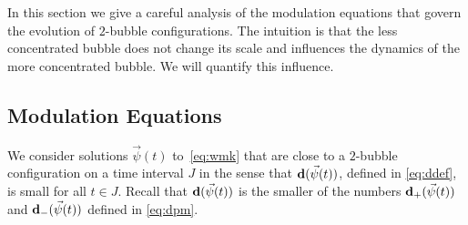 \documentclass[10pt,reqno]{amsart}
\newcommand{\red}[1]{\textcolor{red}{#1}}
\newcommand{\Red}[1]{{\color{red} #1}}
\newcommand{\HH}{\mathcal{H}}
\newcommand{\la}{\lambda}
\newcommand{\La}{\Lambda}
\newcommand{\p}{\partial}
\newcommand{\EQ}[1]{\begin{equation}\begin{split} #1 \end{split}\end{equation}}
\numberwithin{equation}{section}
\theoremstyle{remark}
\newcommand{\ula}{\underline{\lambda}}
\newcommand{\umu}{\underline{\mu}}
\newcommand{\0}{\emptyset}
\newcommand{\bfd}{{\bf d}}
\begin{document}
In this section we give a careful analysis of the modulation equations that govern the
evolution of $2$-bubble configurations.
The intuition is that the less concentrated bubble does not change its scale and influences
the dynamics of the more concentrated bubble. We will quantify this influence.



 


\subsection{Modulation Equations}
We consider solutions $\vec \psi(t)$ to~\eqref{eq:wmk} that are close to a $2$-bubble configuration on a time interval $J$ in the sense that $ \bfd( \vec \psi(t))$,
defined in \eqref{eq:ddef}, is small for all $t \in J$.
Recall that $\bfd(\vec\psi(t))$ is the smaller of the numbers $\bfd_+(\vec\psi(t))$ and $\bfd_-(\vec\psi(t))$ defined in \eqref{eq:dpm}.
\end{document}
